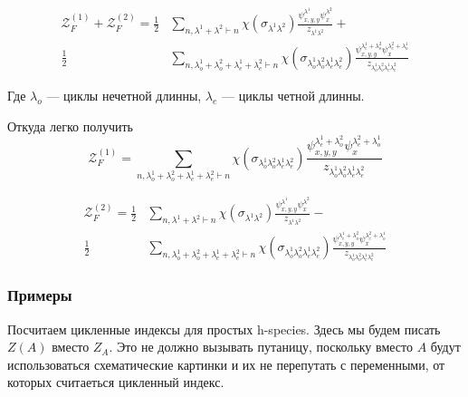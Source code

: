 \begin{equation}
\begin{split}
\mathcal Z_F^{(1)} + \mathcal Z_F^{(2)} = 
\frac{1}{2}&
\sum_{n, \lambda^1 + \lambda^2 \vdash n}\chi(\sigma_{\lambda^1 \lambda^2})
\frac{\psi_{x, y, y}^{\lambda^1} \psi_{x}^{\lambda^2}}{z_{\lambda^1 \lambda^2}}
+ \\
\frac{1}{2}&
\sum_{n, \lambda_o^1 + \lambda_o^2 + \lambda_e^1 + \lambda_e^2 \vdash
n}\chi(\sigma_{\lambda_o^1 \lambda_o^2 \lambda_e^1 \lambda_e^2})
\frac{\psi_{x, y, y}^{\lambda_e^1 + \lambda_o^2} \psi_{x}^{\lambda_e^2 + 
\lambda_o^1}}{z_{\lambda_o^1 \lambda_o^2 \lambda_e^1 \lambda_e^2}}
\end{split}
\end{equation}

Где $\lambda_o$ --- циклы нечетной длинны, $\lambda_e$ ---
циклы четной длинны.

Откуда легко получить
\begin{equation}
\label{eq:h-fr2}
\mathcal Z_F^{(1)} = 
\sum_{n, \lambda_o^1 + \lambda_o^2 + \lambda_e^1 + \lambda_e^2 \vdash
n}\chi(\sigma_{\lambda_o^1 \lambda_o^2 \lambda_e^1 \lambda_e^2})
\frac{\psi_{x, y, y}^{\lambda_e^1 + \lambda_o^2} \psi_{x}^{\lambda_e^2 + 
\lambda_o^1}}{z_{\lambda_o^1 \lambda_o^2 \lambda_e^1 \lambda_e^2}}
\end{equation}

\begin{equation}
\begin{split}
\mathcal Z_F^{(2)} = 
\frac{1}{2}&
\sum_{n, \lambda^1 + \lambda^2 \vdash n}\chi(\sigma_{\lambda^1 \lambda^2})
\frac{\psi_{x, y, y}^{\lambda^1} \psi_{x}^{\lambda^2}}{z_{\lambda^1 \lambda^2}}
- \\
\frac{1}{2}&
\sum_{n, \lambda_o^1 + \lambda_o^2 + \lambda_e^1 + \lambda_e^2 \vdash
n}\chi(\sigma_{\lambda_o^1 \lambda_o^2 \lambda_e^1 \lambda_e^2})
\frac{\psi_{x, y, y}^{\lambda_e^1 + \lambda_o^2} \psi_{x}^{\lambda_e^2 + 
\lambda_o^1}}{z_{\lambda_o^1 \lambda_o^2 \lambda_e^1 \lambda_e^2}}
\end{split}
\end{equation}

\subsubsection{Примеры}
Посчитаем цикленные индексы для простых h-species.
Здесь мы будем писать $Z(A)$ вместо $Z_A$. Это не должно вызывать путаницу,
поскольку вместо $A$ будут использоваться схематические картинки и их
не перепутать с переменными, от которых считаеться цикленный индекс. 


